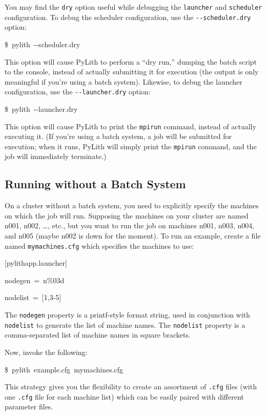 You may find the \texttt{dry} option useful while debugging the \texttt{launcher}
and \texttt{scheduler} configuration. To debug the scheduler configuration,
use the \texttt{-{}-scheduler.dry} option:
\begin{lyxcode}
\$~pylith~-{}-scheduler.dry
\end{lyxcode}
This option will cause PyLith to perform a ``dry run,'' dumping the
batch script to the console, instead of actually submitting it for
execution (the output is only meaningful if you're using a batch system).
Likewise, to debug the launcher configuration, use the \texttt{-{}-launcher.dry}
option:
\begin{lyxcode}
\$~pylith~-{}-launcher.dry
\end{lyxcode}
This option will cause PyLith to print the \texttt{mpirun} command,
instead of actually executing it. (If you're using a batch system,
a job will be submitted for execution; when it runs, PyLith will simply
print the \texttt{mpirun} command, and the job will immediately terminate.)


\subsection{Running without a Batch System}

On a cluster without a batch system, you need to explicitly specify
the machines on which the job will run. Supposing the machines on
your cluster are named n001, n002, \ldots{}, etc., but you want to
run the job on machines n001, n003, n004, and n005 (maybe n002 is
down for the moment). To run an example, create a file named \texttt{mymachines.cfg}
which specifies the machines to use:
\begin{lyxcode}
{[}pylithapp.launcher{]}

nodegen~=~n\%03d

nodelist~=~{[}1,3-5{]}
\end{lyxcode}
The \texttt{nodegen} property is a printf-style format string, used
in conjunction with \texttt{nodelist} to generate the list of machine
names. The \texttt{nodelist} property is a comma-separated list of
machine names in square brackets.

Now, invoke the following:
\begin{lyxcode}
\$~pylith~example.cfg~mymachines.cfg
\end{lyxcode}
This strategy gives you the flexibility to create an assortment of
\texttt{.cfg} files (with one \texttt{.cfg} file for each machine
list) which can be easily paired with different parameter files.

